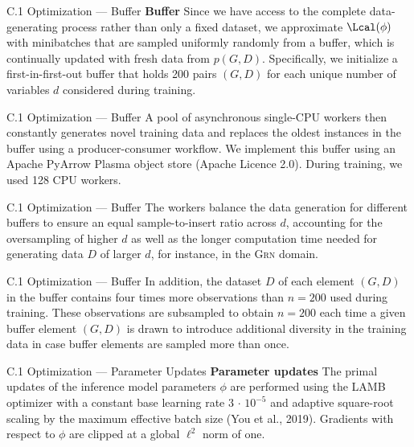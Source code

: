 \documentclass[aspectratio=169,10pt]{beamer}
\newcommand{\domain}[1]{\textsc{#1}}
\newcommand{\grndomain}{\domain{Grn}\xspace}
\begin{document}
\begin{frame}{C.1 Optimization --- Buffer}
\small
\textbf{Buffer}\quad
Since we have access to the complete data-generating process rather than only a fixed dataset, we approximate $\Lcal(\phi)$ with minibatches that are sampled uniformly randomly from a buffer, which is continually updated with fresh data from $p(G, D)$. Specifically, we initialize a first-in-first-out buffer that holds \num{200} pairs $(G, D)$ for each unique number of variables $d$ considered during training.
\end{frame}

\begin{frame}{C.1 Optimization --- Buffer}
A pool of asynchronous single-CPU workers then constantly generates novel training data and replaces the oldest instances in the buffer using a producer-consumer workflow. We implement this buffer using an Apache PyArrow Plasma object store (Apache Licence 2.0). During training, we used \num{128} CPU workers.
\end{frame}

\begin{frame}{C.1 Optimization --- Buffer}
\small
The workers balance the data generation for different buffers to ensure an equal sample-to-insert ratio across $d$, accounting for the oversampling of higher $d$ as well as the longer computation time needed for generating data $D$ of larger $d$, for instance, in the \grndomain domain.
\end{frame}

\begin{frame}{C.1 Optimization --- Buffer}
In addition, the dataset $D$ of each element $(G, D)$ in the buffer contains four times more observations than $n=200$ used during training. These observations are subsampled to obtain $n=200$ each time a given buffer element $(G, D)$ is drawn to introduce additional diversity in the training data in case buffer elements are sampled more than once.
\end{frame}

\begin{frame}{C.1 Optimization --- Parameter Updates}
\textbf{Parameter updates}\quad
The primal updates of the inference model parameters $\phi$ are performed using the LAMB optimizer with a constant base learning rate $3\,{\cdot}\,10^{-5}$ and adaptive square-root scaling by the maximum effective batch size (You et al., 2019). Gradients with respect to $\phi$ are clipped at a global $\ell^2$ norm of one.
\end{frame}
\end{document}
